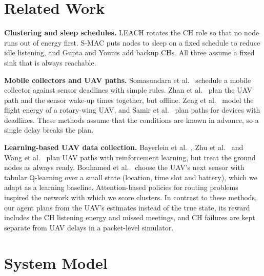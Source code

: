 \documentclass[conference]{IEEEtran}
\begin{document}
\section{Related Work}\label{sec:related}

\textbf{Clustering and sleep schedules.} LEACH \cite{heinzelman2002leach} rotates the CH role
so that no node runs out of energy first. S-MAC \cite{ye2002smac} puts nodes to sleep on a fixed
schedule to reduce idle listening, and Gupta and Younis \cite{gupta2003fault} add backup CHs. All
three assume a fixed sink that is always reachable.

\textbf{Mobile collectors and UAV paths.} Somasundara et al.\ \cite{somasundara2004mobile}
schedule a mobile collector against sensor deadlines with simple rules. Zhan et al.\
\cite{zhan2018energy} plan the UAV path and the sensor wake-up times together, but offline.
Zeng et al.\ \cite{zeng2019rotary} model the flight energy of a rotary-wing UAV, and Samir et
al.\ \cite{samir2020trajectory} plan paths for devices with deadlines. These methods assume that
the conditions are known in advance, so a single delay breaks the plan.

\textbf{Learning-based UAV data collection.} Bayerlein et al.\ \cite{bayerlein2018trajectory},
Zhu et al.\ \cite{zhu2021uav} and Wang et al.\ \cite{wang2022learning} plan UAV paths with
reinforcement learning, but treat the ground nodes as always ready. Bouhamed et al.\
\cite{bouhamed2020uav} choose the UAV's next sensor with tabular Q-learning over a small state
(location, time slot and battery), which we adapt as a learning baseline. Attention-based
policies for routing problems \cite{kool2019attention} inspired the network with which we score
clusters. In contrast to these methods, our agent plans from the UAV's estimates instead of
the true state, its reward includes the CH listening energy and missed meetings, and CH
failures are kept separate from UAV delays in a packet-level simulator.

\section{System Model}\label{sec:system}
\end{document}
